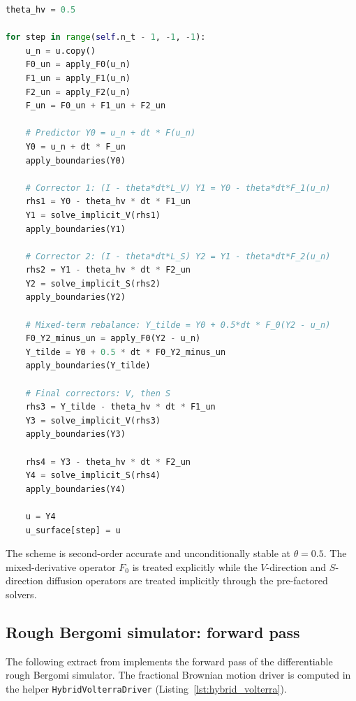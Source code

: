 \documentclass[12pt,a4paper]{article}
\theoremstyle{definition}
\theoremstyle{plain}
\theoremstyle{remark}
\theoremstyle{plain}
\begin{document}
\begin{lstlisting}[language=Python, caption={Hundsdorfer-Verwer ADI step for Heston PDE}, label={lst:heston_pde_code}]
theta_hv = 0.5

for step in range(self.n_t - 1, -1, -1):
    u_n = u.copy()
    F0_un = apply_F0(u_n)
    F1_un = apply_F1(u_n)
    F2_un = apply_F2(u_n)
    F_un = F0_un + F1_un + F2_un

    # Predictor Y0 = u_n + dt * F(u_n)
    Y0 = u_n + dt * F_un
    apply_boundaries(Y0)

    # Corrector 1: (I - theta*dt*L_V) Y1 = Y0 - theta*dt*F_1(u_n)
    rhs1 = Y0 - theta_hv * dt * F1_un
    Y1 = solve_implicit_V(rhs1)
    apply_boundaries(Y1)

    # Corrector 2: (I - theta*dt*L_S) Y2 = Y1 - theta*dt*F_2(u_n)
    rhs2 = Y1 - theta_hv * dt * F2_un
    Y2 = solve_implicit_S(rhs2)
    apply_boundaries(Y2)

    # Mixed-term rebalance: Y_tilde = Y0 + 0.5*dt * F_0(Y2 - u_n)
    F0_Y2_minus_un = apply_F0(Y2 - u_n)
    Y_tilde = Y0 + 0.5 * dt * F0_Y2_minus_un
    apply_boundaries(Y_tilde)

    # Final correctors: V, then S
    rhs3 = Y_tilde - theta_hv * dt * F1_un
    Y3 = solve_implicit_V(rhs3)
    apply_boundaries(Y3)

    rhs4 = Y3 - theta_hv * dt * F2_un
    Y4 = solve_implicit_S(rhs4)
    apply_boundaries(Y4)

    u = Y4
    u_surface[step] = u
\end{lstlisting}

The scheme is second-order accurate and unconditionally stable at
$\theta = 0.5$. The mixed-derivative operator $F_0$ is treated
explicitly while the $V$-direction and $S$-direction diffusion
operators are treated implicitly through the pre-factored solvers.

\subsection{Rough Bergomi simulator: forward pass}
\label{lst:rbergomi_simulate}

The following extract from 
implements the forward pass of the differentiable rough Bergomi
simulator. The fractional Brownian motion driver is computed in the
helper \texttt{HybridVolterraDriver} (Listing~\ref{lst:hybrid_volterra}).
\end{document}
